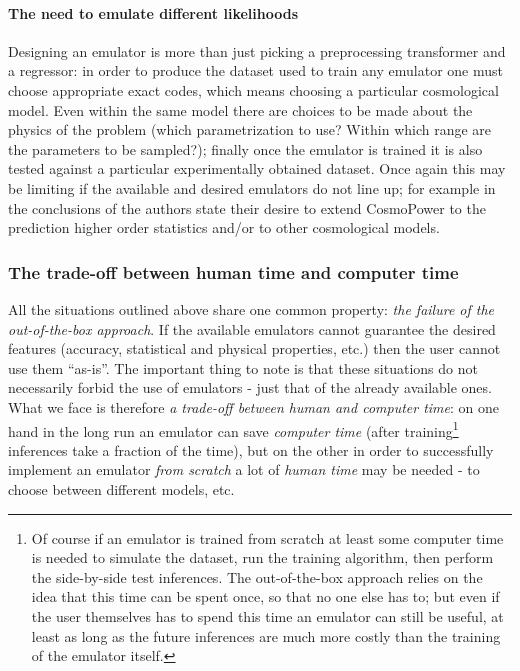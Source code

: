 \paragraph{The need to emulate different likelihoods}
Designing an emulator is more than just picking a preprocessing transformer and a regressor: in order to produce the dataset used to train any emulator one must choose appropriate exact codes, which means choosing a particular cosmological model. Even within the same model there are choices to be made about the physics of the problem (which parametrization to use? Within which range are the parameters to be sampled?); finally once the emulator is trained it is also tested against a particular experimentally obtained dataset. Once again this may be limiting if the available and desired emulators do not line up; for example in the conclusions of \cite{cosmopower} the authors state their desire to extend CosmoPower to the prediction higher order statistics and/or to other cosmological models.


\subsubsection{The trade-off between human time and computer time}
All the situations outlined above share one common property: \emph{the failure of the out-of-the-box approach}. If the available emulators cannot guarantee the desired features (accuracy, statistical and physical properties, etc.) then the user cannot use them ``as-is''. The important thing to note is that these situations do not necessarily forbid the use of emulators - just that of the already available ones. What we face is therefore \emph{a trade-off between human and computer time}: on one hand in the long run an emulator can save \emph{computer time} (after training\footnote{Of course if an emulator is trained from scratch at least some computer time is needed to simulate the dataset, run the training algorithm, then perform the side-by-side test inferences. The out-of-the-box approach relies on the idea that this time can be spent once, so that no one else has to; but even if the user themselves has to spend this time an emulator can still be useful, at least as long as the future inferences are much more costly than the training of the emulator itself.} inferences take a fraction of the time), but on the other in order to successfully implement an emulator \emph{from scratch} a lot of \emph{human time} may be needed - to choose between different models, etc.

